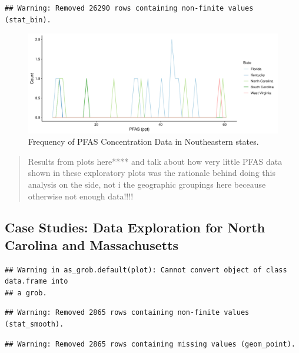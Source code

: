 \documentclass[12pt,]{article}
\begin{document}
\begin{verbatim}
## Warning: Removed 26290 rows containing non-finite values (stat_bin).
\end{verbatim}

\begin{figure}
\centering
\includegraphics{Project_Template_files/figure-latex/figs4-1.pdf}
\caption{Frequency of PFAS Concentration Data in Noutheastern states.}
\end{figure}

\begin{quote}
Results from plots here**** and talk about how very little PFAS data
shown in these exploratory plots was the rationale behind doing this
analysis on the side, not i the geographic groupings here beceause
otherwise not enough data!!!!
\end{quote}

\newpage

\hypertarget{case-studies-data-exploration-for-north-carolina-and-massachusetts}{%
\subsection{Case Studies: Data Exploration for North Carolina and
Massachusetts}\label{case-studies-data-exploration-for-north-carolina-and-massachusetts}}

\begin{verbatim}
## Warning in as_grob.default(plot): Cannot convert object of class data.frame into
## a grob.
\end{verbatim}

\begin{verbatim}
## Warning: Removed 2865 rows containing non-finite values (stat_smooth).
\end{verbatim}

\begin{verbatim}
## Warning: Removed 2865 rows containing missing values (geom_point).
\end{verbatim}
\end{document}
